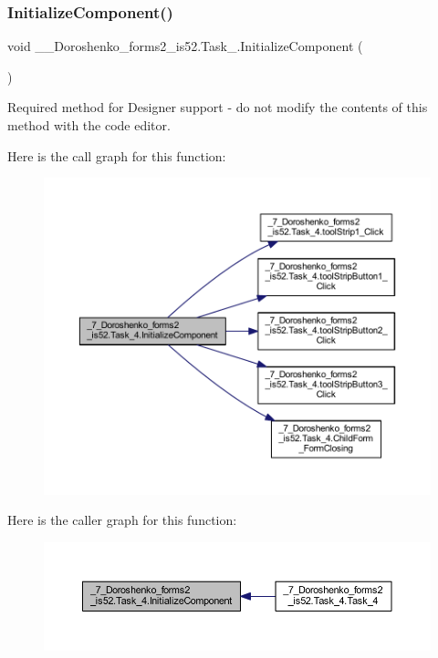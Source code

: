 \subsubsection{\texorpdfstring{Initialize\+Component()}{InitializeComponent()}}
{\footnotesize\ttfamily void \+\_\+\_\+\+Doroshenko\+\_\+forms2\+\_\+is52.\+Task\+\_.\+Initialize\+Component (\begin{DoxyParamCaption}{ }\end{DoxyParamCaption})\hspace{0.3cm}{\ttfamily [private]}}



Required method for Designer support -\/ do not modify the contents of this method with the code editor. 

Here is the call graph for this function\+:
\nopagebreak
\begin{figure}[H]
\begin{center}
\leavevmode
\includegraphics[width=350pt]{class__7___doroshenko__forms2__is52_1_1_task__4_a05edfb7213a5950c11b47d82731d3b66_cgraph}
\end{center}
\end{figure}
Here is the caller graph for this function\+:
\nopagebreak
\begin{figure}[H]
\begin{center}
\leavevmode
\includegraphics[width=350pt]{class__7___doroshenko__forms2__is52_1_1_task__4_a05edfb7213a5950c11b47d82731d3b66_icgraph}
\end{center}
\end{figure}
